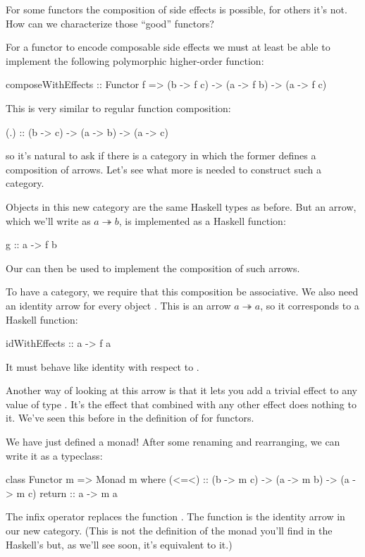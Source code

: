 \documentclass[DaoFP]{subfiles}
\begin{document}
For some functors the composition of side effects is possible, for others it's not. How can we characterize those ``good'' functors?

For a functor to encode composable side effects we must at least be able to implement the following polymorphic higher-order function: 
\begin{haskell}
composeWithEffects :: Functor f => 
       (b -> f c) -> (a -> f b) -> (a -> f c)
\end{haskell}
This is very similar to regular function composition:
\begin{haskell}
(.) :: (b -> c) -> (a -> b) -> (a -> c)
\end{haskell}
so it's natural to ask if there is a category in which the former defines a composition of arrows. Let's see what more is needed to construct such a category.

Objects in this new category are the same Haskell types as before. But an arrow, which we'll write as $a \twoheadrightarrow b$, is implemented as a Haskell function:
\begin{haskell}
g :: a -> f b
\end{haskell}
Our  can then be used to implement the composition of such arrows. 

To have a category, we require that this composition be associative. We also need an identity arrow for every object . This is an arrow $a \twoheadrightarrow a$, so it corresponds to a Haskell function:
\begin{haskell}
idWithEffects :: a -> f a
\end{haskell}
It must behave like identity with respect to .

Another way of looking at this arrow is that it lets you add a trivial effect to any value of type . It's the effect that combined with any other effect does nothing to it. We've seen this before in the definition of  for  functors. 

We have just defined a monad! After some renaming and rearranging, we can write it as a typeclass:
\begin{haskell}
class Functor m => Monad m where
  (<=<) :: (b -> m c) -> (a -> m b) -> (a -> m c)
  return :: a -> m a
\end{haskell}
The infix operator \hask{<=<} replaces the function . The  function is the identity arrow in our new category. (This is not the definition of the monad you'll find in the Haskell's  but, as we'll see soon, it's equivalent to it.)
\end{document}
